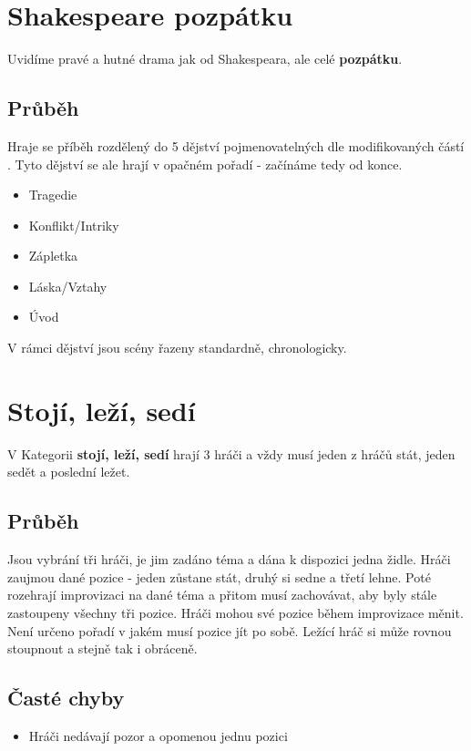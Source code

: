 \documentclass[main.tex]{subfiles}
\begin{document}
\needspace{5cm} \section{Shakespeare pozpátku} \label{shakespeare pozpátku}  
 
Uvidíme pravé a hutné drama jak od Shakespeara, ale celé \textbf{pozpátku}{}. 
\subsection{Průběh} Hraje se příběh rozdělený do 5 dějství pojmenovatelných dle modifikovaných částí .  
Tyto dějství se ale hrají v opačném pořadí - začínáme tedy od konce.  
\begin{itemize}
\item Tragedie
\item Konflikt/Intriky
\item Zápletka
\item Láska/Vztahy
\item Úvod
\end{itemize}
 
V rámci dějství jsou scény řazeny standardně, chronologicky.  
 
 
 
\needspace{5cm} \section{Stojí, leží, sedí} \label{stojí, leží, sedí}  
 
V Kategorii \textbf{stojí, leží, sedí}{} hrají 3 hráči a vždy musí jeden z hráčů stát, jeden sedět a poslední ležet. 
 
\subsection{ Průběh } Jsou vybrání tři hráči, je jim zadáno téma a dána k dispozici jedna židle. Hráči zaujmou dané pozice - jeden zůstane stát, druhý si sedne a třetí lehne. Poté rozehrají improvizaci na dané téma a přitom musí zachovávat, aby byly stále zastoupeny všechny tři pozice. Hráči mohou své pozice během improvizace měnit. Není určeno pořadí v jakém musí pozice jít po sobě. Ležící hráč si může rovnou stoupnout a stejně tak i obráceně.  
 
\subsection{ Časté chyby } \begin{itemize}
\item Hráči nedávají pozor a opomenou jednu pozici
\end{itemize}
 
\end{document}
